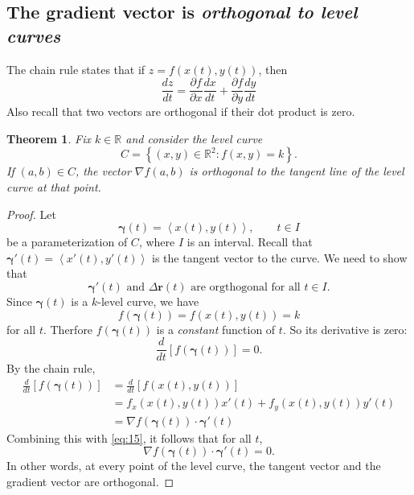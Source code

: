 \documentclass[10pt]{article}
\newtheorem{theorem}{Theorem}
\theoremstyle{definition}
\newcommand{\1}[1]{\textbf{1}_{\left[#1\right]}} %
\def\R{\mathbb{R}} %
\begin{document}
\subsection{The gradient vector is \textit{orthogonal to level curves}}


The chain rule states that if $z=f(x(t),y(t))$, then
\begin{equation*}
  \frac{dz}{dt} = \frac{\partial f}{\partial x} \frac{dx}{dt} +\frac{\partial f}{\partial y} \frac{dy}{dt}
\end{equation*}
Also recall that two vectors are orthogonal if their dot product is zero.

\begin{theorem}
  Fix $k\in \R$ and consider the level curve
  \begin{equation*}
    C = \left\{(x,y)\in \R^{2}: f(x,y)=k\right\}.
  \end{equation*}
  If $(a,b)\in C$, the vector $\nabla f(a,b)$ is orthogonal to the tangent
  line of the level curve at that point.
\end{theorem}

\begin{proof}
  Let
  \begin{equation*}
    \boldsymbol{\gamma}(t) = \left\langle x(t),y(t) \right\rangle, \qquad t\in I
  \end{equation*}
  be a parameterization of $C$, where $I$ is an interval. Recall that
  $\boldsymbol{\gamma}'(t)= \left\langle x'(t),y'(t) \right\rangle $ is the
  tangent vector to the curve. We need to show that
  \begin{equation*}
    \boldsymbol{\gamma}'(t)  \text{ and } \Delta \boldsymbol{r}(t)
     \text{ are orgthogonal for all $t\in I$.}
  \end{equation*}
  Since $\boldsymbol{\gamma}(t)$ is a
  $k$-level curve, we have
  \begin{equation*}
    f(\boldsymbol{\gamma}(t)) = f(x(t),y(t)) = k
  \end{equation*}
  for all $t$. Therfore $f(\boldsymbol{\gamma}(t))$ is a \textit{constant} function of $t$.
  So its derivative is zero:
  \begin{equation}\label{eq:15}
    \frac{d}{dt}\left[ f(\boldsymbol{\gamma}(t)) \right] = 0.
  \end{equation}
  By the chain rule,
  \begin{align*}
    \frac{d}{dt} \left[ f(\boldsymbol{\gamma}(t)) \right] 
    &= \frac{d}{dt}\left[ f(x(t),y(t)) \right]\\ 
    &= f_{x}(x(t),y(t)) x'(t) + f_{y}(x(t),y(t))y'(t)\\
    &= \nabla f(\boldsymbol{\gamma}(t)) \cdot\boldsymbol{\gamma}'(t)
  \end{align*}
  Combining this with \cref{eq:15}, it follows that for all $t$, 
  \begin{equation*}
    \nabla f(\boldsymbol{\gamma}(t)) \cdot\boldsymbol{\gamma}'(t) = 0.
  \end{equation*}
  In other words, at every point of the level curve, the tangent vector and
  the gradient vector are orthogonal.
\end{proof}
\end{document}

